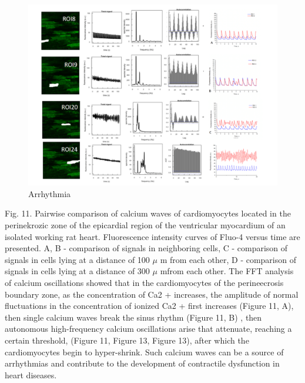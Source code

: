\documentclass[a4paper,12pt]{article}
\begin{document}
\begin{figure}
    \includegraphics[width=\linewidth]{fig5.png}
    \caption{Arrhythmia}
    \label{fig:fig5}
\end{figure}

Fig. 11. Pairwise comparison of calcium waves of cardiomyocytes located in the perinekrozic zone of the epicardial region of the ventricular myocardium of an isolated working rat heart. Fluorescence intensity curves of Fluo-4 versus time are presented. A, B - comparison of signals in neighboring cells, C - comparison of signals in cells lying at a distance of 100 $\mu$ m from each other, D - comparison of signals in cells lying at a distance of 300 $\mu$  mfrom each other.
The FFT analysis of calcium oscillations showed that in the cardiomyocytes of the perineecrosis boundary zone, as the concentration of Ca2 + increases, the amplitude of normal fluctuations in the concentration of ionized Ca2 + first increases (Figure 11, A), then single calcium waves break the sinus rhythm (Figure 11, B) , then autonomous high-frequency calcium oscillations arise that attenuate, reaching a certain threshold, (Figure 11, Figure 13, Figure 13), after which the cardiomyocytes begin to hyper-shrink. Such calcium waves can be a source of arrhythmias and contribute to the development of contractile dysfunction in heart diseases.
\end{document}
